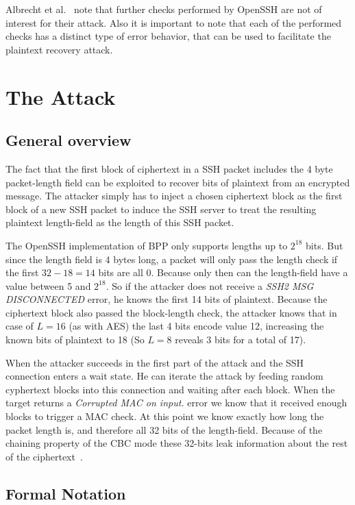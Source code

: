 \documentclass[twocolumn]{article}
\begin{document}
\indent Albrecht et al.~\cite{Albrecht2009} note that further checks performed by OpenSSH are not of interest for their attack. Also it is important to note that each of the performed checks has a distinct type of error behavior, that can be used to facilitate the plaintext recovery attack.


\section{The Attack}

\subsection*{General overview}

\indent The fact that the first block of ciphertext in a SSH packet includes the 4 byte packet-length field can be exploited to recover bits of plaintext from an encrypted message. The attacker simply has to inject a chosen ciphertext block as the first block of a new SSH packet to induce the SSH server to treat the resulting plaintext length-field as the length of this SSH packet.

\indent The OpenSSH implementation of BPP only supports lengths up to $2^{18}$ bits. But since the length field is 4 bytes long, a packet will only pass the length check if the first $32-18=14$ bits are all 0. Because only then can the length-field have a value between 5 and $2^{18}$. So if the attacker does not receive a \textit{SSH2 MSG DISCONNECTED} error, he knows the first 14 bits of plaintext. Because the ciphertext block also passed the block-length check, the attacker knows that in case of $L = 16$ (as with AES) the last 4 bits encode value 12, increasing the known bits of plaintext to 18 (So $L=8$ reveals 3 bits for a total of 17).

\indent When the attacker succeeds in the first part of the attack and the SSH connection enters a wait state. He can iterate the attack by feeding random cyphertext blocks into this connection and waiting after each block. When the target returns a \textit{Corrupted MAC on input.} error we know that it received enough blocks to trigger a MAC check. At this point we know exactly how long the packet length is, and therefore all 32 bits of the length-field. Because of the chaining property of the CBC mode these 32-bits leak information about the rest of the ciphertext~\cite{Albrecht2009}.

\subsection*{Formal Notation}
\end{document}
